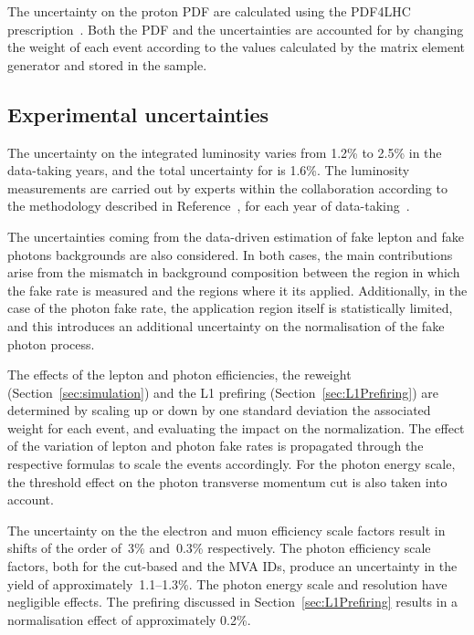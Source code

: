 The uncertainty on the proton PDF are calculated using the PDF4LHC prescription~\cite{Botje:2011sn,Alekhin:2011sk}.
Both the PDF and the \alpS uncertainties are accounted for by changing the
weight of each event according to the values calculated by the matrix element
generator and stored in the sample.

\subsection{Experimental uncertainties}
The uncertainty on the integrated luminosity varies from 1.2\usep\% to 2.5\usep\% in the data-taking years, and the total uncertainty for \RunII{} is 1.6\usep\%.
The luminosity measurements are carried out by experts within the collaboration according to the methodology described in Reference~\cite{CMS-LUM-17-003},
for each year of data-taking~\cite{CMS-LUM-17-004, CMS-LUM-18-002}.


The uncertainties coming from the data-driven estimation of fake lepton and fake photons backgrounds are also considered.
In both cases, the main contributions arise from the mismatch in background composition between the region in which the fake rate is measured and the regions where it its applied.
Additionally, in the case of the photon fake rate, the application region itself is statistically limited, and this introduces an additional uncertainty on the normalisation of the fake photon process.

The effects of the lepton and photon efficiencies, the \pileup{} reweight (Section~\ref{sec:simulation})
and the L1 prefiring (Section~\ref{sec:L1Prefiring})
are determined by scaling up or down by one standard deviation the associated weight for each event,
and evaluating the impact on the normalization.
The effect of the variation of lepton and photon fake rates is propagated through the
respective formulas to scale the events accordingly.
For the photon energy scale, the threshold effect on the photon transverse momentum cut
is also taken into account.

The uncertainty on the the electron and muon efficiency scale factors
result in shifts of the order of~3\usep\% and~0.3\usep\% respectively.
The photon efficiency scale factors, both for the cut-based and the MVA IDs,
produce an uncertainty in the yield of approximately~1.1--1.3\usep\%.
The photon energy scale and resolution have negligible effects.
The \Lone prefiring discussed in Section~\ref{sec:L1Prefiring}
results in a normalisation effect of approximately 0.2\usep\%.

